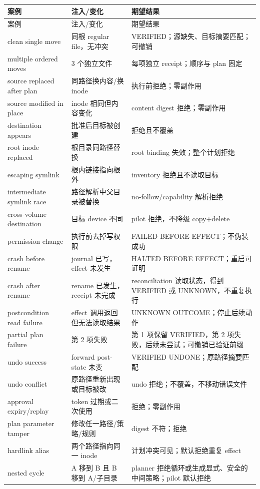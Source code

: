 \documentclass[UTF8,fontset=none,zihao=-4,openany]{ctexrep}
\begin{document}
\begin{longtable}{p{42mm}p{45mm}p{68mm}}
\toprule
案例 & 注入/变化 & 期望结果 \\
\midrule
\endfirsthead
\toprule
案例 & 注入/变化 & 期望结果 \\
\midrule
\endhead
clean single move & 同根 regular file，无冲突 & VERIFIED；源缺失、目标摘要匹配；可撤销 \\
multiple ordered moves & 3 个独立文件 & 每项独立 receipt；顺序与 plan 固定 \\
source replaced after plan & 同路径换内容/换 inode & 执行前拒绝；零副作用 \\
source modified in place & inode 相同但内容变化 & content digest 拒绝；零副作用 \\
destination appears & 批准后目标被创建 & 拒绝且不覆盖 \\
root inode replaced & 根目录同路径替换 & root binding 失效；整个计划拒绝 \\
escaping symlink & 根内链接指向根外 & inventory 拒绝且不读取目标 \\
intermediate symlink race & 路径解析中父目录被替换 & no-follow/capability 解析拒绝 \\
cross-volume destination & 目标 device 不同 & pilot 拒绝，不降级 copy+delete \\
permission change & 执行前去掉写权限 & FAILED BEFORE EFFECT；不伪装成功 \\
crash before rename & journal 已写，effect 未发生 & HALTED BEFORE EFFECT；重启可证明 \\
crash after rename & rename 已发生，receipt 未完成 & reconciliation 读取状态，得到 VERIFIED 或 UNKNOWN，不重复执行 \\
postcondition read failure & effect 调用返回但无法读取结果 & UNKNOWN OUTCOME；停止后续动作 \\
partial plan failure & 第 2 项失败 & 第 1 项保留 VERIFIED，第 2 项失败，后续未尝试；可撤销已验证前缀 \\
undo success & forward post-state 未变 & VERIFIED UNDONE；原路径摘要匹配 \\
undo conflict & 原路径重新出现或目标被改 & undo 拒绝；不覆盖，不移动错误文件 \\
approval expiry/replay & token 过期或二次使用 & 拒绝；零副作用 \\
plan parameter tamper & 修改任一路径/策略/规则 & digest 不符；拒绝 \\
hardlink alias & 两个路径指向同一 inode & 计划冲突可见；默认拒绝重复 effect \\
nested cycle & A 移到 B 且 B 移到 A/子目录 & planner 拒绝循环或生成显式、安全的中间策略；pilot 默认拒绝 \\
\bottomrule
\end{longtable}
\end{document}
